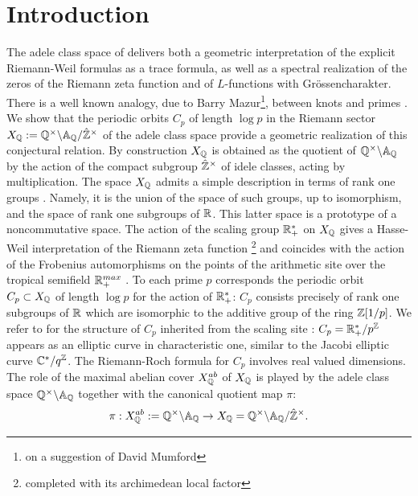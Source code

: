 \section{Introduction}

The adele class space of \cite{Co-zeta} delivers both a geometric interpretation of the explicit Riemann-Weil formulas as a trace formula, as well as a spectral realization of the zeros of the Riemann zeta function and of $L$-functions with Gr\"ossencharakter. There is a well known analogy, due to Barry Mazur\footnote{on a suggestion of David Mumford},  between knots and primes \cite{Mazur0,Mazur,Mazur1,Mazur2,Morishita,Morishita1}. 
We show that the periodic orbits $C_p$ of length $\log p$ in the Riemann sector $X_{\mathbb Q}:={\mathbb Q}^\times \backslash {\mathbb A}_{\mathbb Q}/{\hat{\mathbb{Z}}^\times}$ of the adele class space provide a geometric realization of this conjectural relation. 
By construction $X_{\mathbb Q}$ is obtained as the quotient of ${\mathbb Q}^\times \backslash {\mathbb A}_{\mathbb Q}$ by the action of the compact subgroup ${\hat{\mathbb{Z}}^\times}$ of idele classes, acting by multiplication. The space $X_{\mathbb Q}$ admits a simple description in terms of rank one groups \cite{CCas}. Namely, it is the union of the space of such groups, up to isomorphism, and the space of rank one subgroups of $\mathbb{R}$. This latter space is a prototype of  a noncommutative space.\newline
The action of the scaling group $\mathbb{R}_+^*$ on $X_{\mathbb Q}$ gives a Hasse-Weil interpretation of the Riemann zeta function \footnote{completed with its archimedean local factor}  \cite{CC1,ccmonoids} and coincides with the action of the Frobenius automorphisms on the points of the arithmetic site over the tropical semifield $\mathbb{R}_+^{max}$ \cite{CCas}. 
To each prime $p$ corresponds the  periodic orbit $C_p\subset X_{\mathbb Q}$ of length $\log p$ for the action of $\mathbb{R}_+^*$:  $C_p$ consists precisely of  rank one subgroups of $\mathbb{R}$ which are isomorphic to the additive group of the ring $\mathbb{Z}[1/p]$.  We refer to \cite{CCscal1} for the structure of $C_p$ inherited from the scaling site :  $C_p=\mathbb{R}_+^*/p^{\mathbb{Z}}$ appears as an  elliptic curve in characteristic one,  similar to the Jacobi elliptic curve ${\mathbb C}^*/q^{\mathbb{Z}}$. The Riemann-Roch formula for $C_p$ involves real valued dimensions. \newline
The role of  the maximal abelian cover $X_{\mathbb Q}^{ab}$ of $X_{\mathbb Q}$ is played by the adele class space ${\mathbb Q}^\times \backslash {\mathbb A}_{\mathbb Q}$ together with the  canonical quotient map $\pi$:
\begin{equation}\label{mappi}
\pi:X_{\mathbb Q}^{ab}:= {\mathbb Q}^\times \backslash {\mathbb A}_{\mathbb Q}\to X_{\mathbb Q}={\mathbb Q}^\times \backslash {\mathbb A}_{\mathbb Q}/{\hat{\mathbb{Z}}^\times}.
\end{equation}
